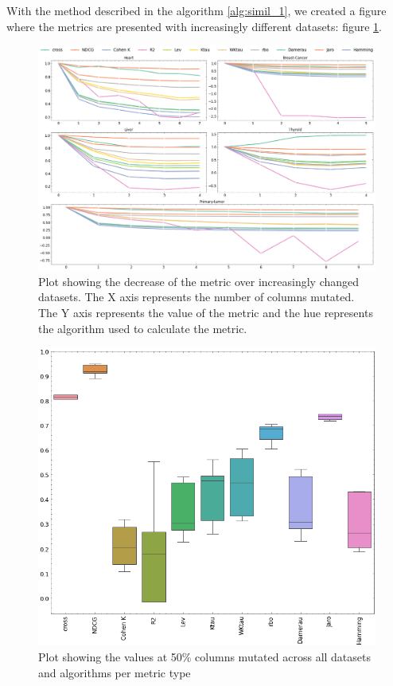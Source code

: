 With the method described in the algorithm \ref{alg:simil_1}, we created a figure where the metrics are presented with increasingly different datasets: figure \ref{fig:lineplot}.


\begin{figure}[htbp]
\centering
\caption{Plot showing the decrease of the metric over increasingly changed datasets. The X axis represents the number of columns mutated. The Y axis represents the value of the metric and the hue represents the algorithm used to calculate the metric.}\label{fig:lineplot} 
\includegraphics[scale=0.32]{figures/multiple_datasets.png}
\end{figure}


\begin{figure}[htbp]
\centering
\caption{Plot showing the values at 50\% columns mutated across all datasets and algorithms per metric type}\label{fig:boxplot} 
\includegraphics[scale=0.40]{figures/50_percent_data.png}
\end{figure}


